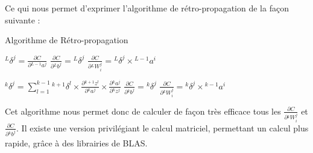 \documentclass[a4paper, 11pt]{report}
\newcommand{\lexp}[1]{\phantom{}^{#1}}
\newcommand{\elem}[4]{\lexp{#2}#1^{#3}_{#4}}
\begin{document}
Ce qui nous permet d'exprimer l'algorithme de rétro-propagation de la façon suivante :
\begin{algorithm}[H]
	\caption{Algorithme de Rétro-propagation}
	\begin{algorithmic}
		\STATE
		\STATE $\elem{\delta}{L}{j}{} = \frac{\partial C}{\partial \elem{a}{L-1}{j}{}}$
		\STATE $\frac{\partial C}{\partial \elem{b}{L}{j}{}} = \elem{\delta}{L}{j}{}$
		\STATE $\frac{\partial C}{\partial \elem{W}{L}{j}{i}} = \elem{\delta}{L}{j}{} \times \elem{a}{L-1}{i}{}$
		\ENDFOR
		\ENDFOR
						    
		\STATE
		\STATE $\elem{\delta}{k}{j}{} = \sum_{l=1}^{k-1}{\elem{\delta}{k+1}{l}{} \times \frac{\partial \elem{z}{k+1}{l}{}}{\partial \elem{a}{k}{j}{}} \times \frac{\partial \elem{a}{k}{j}{}}{\partial \elem{z}{k}{j}{}}}$
		\STATE $\frac{\partial C}{\partial \elem{b}{k}{j}{}} = \elem{\delta}{k}{j}{}$
		\STATE $\frac{\partial C}{\partial \elem{W}{k}{j}{i}} = \elem{\delta}{k}{j}{}  \times \elem{a}{k-1}{i}{}$
		\ENDFOR
		\ENDFOR
		\ENDFOR
						    
	\end{algorithmic}
\end{algorithm}
Cet algorithme nous permet donc de calculer de façon très efficace tous les $\frac{\partial C}{\partial \elem{W}{k}{j}{i}}$ et $\frac{\partial C}{\partial \elem{b}{k}{j}{}}$.
Il existe une version privilégiant le calcul matriciel, permettant un calcul plus rapide, grâce à des librairies de BLAS.
\end{document}
